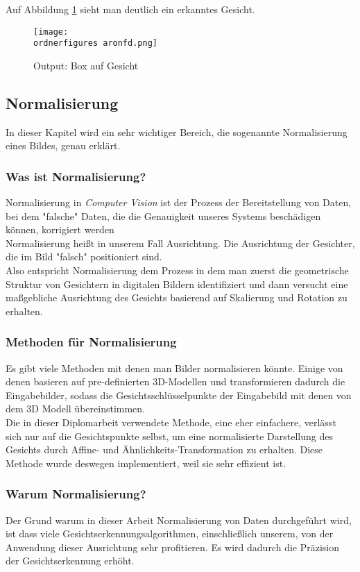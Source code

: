 	Auf Abbildung \ref{fig:aron} sieht man deutlich ein erkanntes Gesicht.
	\begin{figure}[H]
		\centering
		\texttt{[image: \\ordnerfigures aronfd.png]}
		\caption{Output: Box auf Gesicht}
		\label{fig:aron}
	\end{figure}



\subsection{Normalisierung}

\label{normal}

	
	In dieser Kapitel wird ein sehr wichtiger Bereich, die sogenannte Normalisierung
	eines Bildes, genau erklärt. 
	
	\subsubsection{Was ist Normalisierung?}
	
	Normalisierung in \textit{Computer Vision} ist der Prozess der Bereitstellung
	von Daten, bei dem "falsche" Daten, die die Genauigkeit unseres Systems
	beschädigen können, korrigiert werden\\ 
	Normalisierung heißt in unserem Fall Ausrichtung. 
	Die Ausrichtung der Gesichter, die im Bild "falsch" positioniert sind. \\
	Also entspricht Normalisierung dem Prozess in dem man zuerst die geometrische
	Struktur von Gesichtern in digitalen Bildern identifiziert und dann versucht
	eine maßgebliche Ausrichtung des Gesichts basierend auf Skalierung und Rotation
	zu erhalten.
	\subsubsection{Methoden für Normalisierung}
	Es gibt viele Methoden mit denen man Bilder normalisieren könnte. 
	Einige von denen basieren auf pre-definierten 3D-Modellen und transformieren
	dadurch die Eingabebilder, sodass die Gesichtsschlüsselpunkte der Eingabebild
	mit denen von dem 3D Modell übereinstimmen.
	\\
	Die in dieser Diplomarbeit verwendete Methode, eine eher einfachere, verlässt
	sich nur auf die Gesichtspunkte selbst, um eine normalisierte Darstellung des
	Gesichts durch Affine- und Ähnlichkeits-Transformation zu erhalten.
	Diese Methode wurde deswegen implementiert, weil sie sehr effizient ist.
	
	\subsubsection{Warum Normalisierung?}
	Der Grund warum in dieser Arbeit Normalisierung von Daten durchgeführt wird, ist
	dass viele Gesichtserkennungsalgorithmen, einschließlich unserem, von der
	Anwendung dieser Ausrichtung sehr profitieren. 
	Es wird dadurch die Präzision der Gesichtserkennung erhöht. 
	
